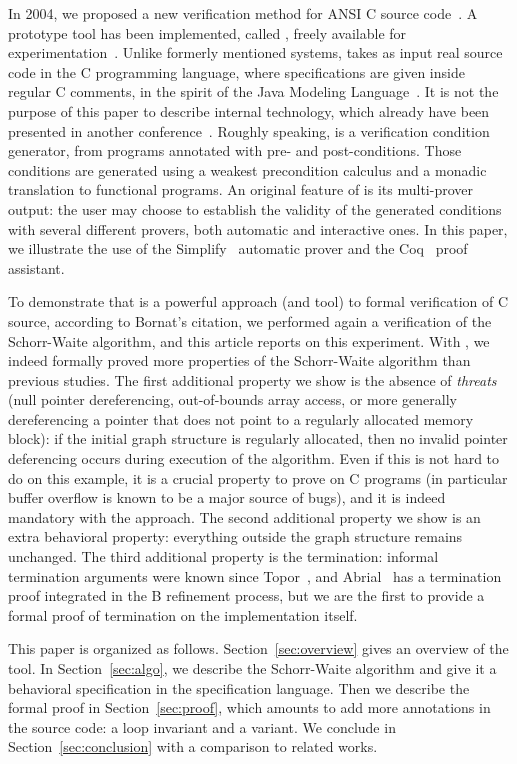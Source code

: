 In 2004, we proposed a new verification method for ANSI C source
code~\cite{filliatre04icfem}.  A prototype tool has been implemented,
called \caduceus{}, freely available for
experimentation~\cite{Caduceus}. Unlike formerly mentioned systems,
\caduceus{} takes as input real source code in the C programming
language, where specifications are given inside regular C comments, in
the spirit of the Java Modeling Language~\cite{leavens00jml}. It is
not the purpose of this paper to describe \caduceus{} internal
technology, which already have been presented in another
conference~\cite{filliatre04icfem}. Roughly 
speaking, \caduceus{} is a verification condition generator, from
programs annotated with pre- and post-conditions. Those conditions are
generated using a weakest precondition calculus and a monadic
translation to functional programs. An original feature of \caduceus{}
is its multi-prover output: the user may choose to establish the
validity of the generated conditions with several different provers,
both automatic and interactive ones. In this paper, we illustrate the
use of the Simplify~\cite{simplify} automatic prover and the
Coq~\cite{CoqProofAssistant} proof assistant.

To demonstrate that \caduceus{} is a powerful approach (and
tool) to formal verification of C source, according to Bornat's
citation, we performed again a verification of the
Schorr-Waite algorithm, and this article reports on this experiment.
With \caduceus{}, we indeed formally proved more properties of the
Schorr-Waite algorithm than previous studies.  The first additional
property we show is the absence of \emph{threats} (null pointer
dereferencing, out-of-bounds array access, or more generally dereferencing
a pointer that does not point to a regularly allocated memory block):
if the initial graph structure is regularly allocated, then no invalid pointer deferencing occurs during execution
of the algorithm. Even if this is not hard to do on this example, it
is a crucial property to prove on C programs (in particular buffer
overflow is known to be a major source of bugs), and it is indeed
mandatory with the \caduceus{} approach. The second additional
property we show is an extra behavioral property: everything outside
the graph structure remains unchanged. The third additional property is
the termination: informal termination arguments were known
since Topor~\cite{topor79acta}, and Abrial~\cite{abrial03fme} has a
termination proof integrated in the B refinement process, but we are
the first to provide a formal proof of termination on the implementation
itself.

This paper is organized as follows.  Section~\ref{sec:overview} gives
an overview of the \caduceus{} tool.  In Section~\ref{sec:algo}, we
describe the Schorr-Waite algorithm and give it a behavioral
specification in the \caduceus{} specification language.  Then we
describe the formal proof in Section~\ref{sec:proof}, which
amounts to add more annotations in the source code: a loop invariant
and a variant. We conclude in Section~\ref{sec:conclusion} with a
comparison to related works.





